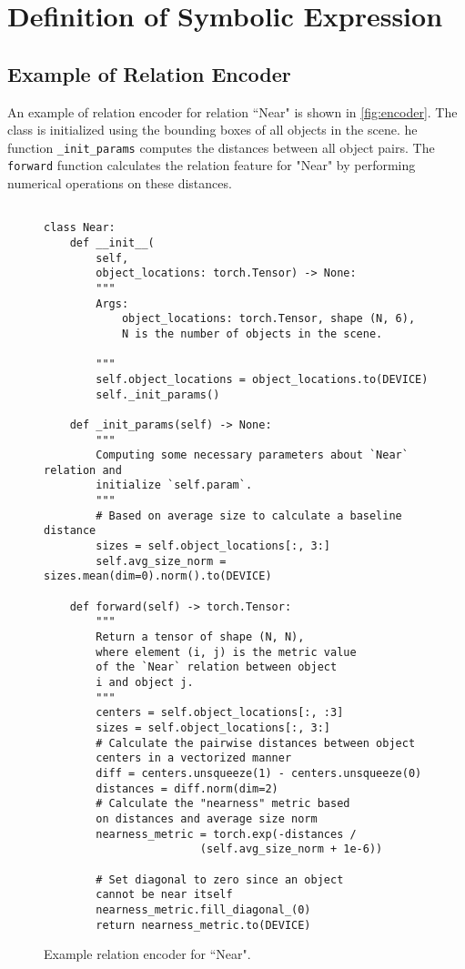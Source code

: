 \section{Definition of Symbolic Expression}
\label{sec:retreiver}
\subsection{Example of Relation Encoder}

An example of relation encoder for relation ``Near" is shown in \autoref{fig:encoder}. 
The class is initialized using the bounding boxes of all objects in the scene.  
he function \texttt{\_init\_params} computes the distances between all object pairs. The \texttt{forward} function calculates the relation feature for "Near" by performing numerical operations on these distances.

\begin{figure}
\centering
\begin{lstlisting}[style=pythonstyle]

class Near:
    def __init__(
        self, 
        object_locations: torch.Tensor) -> None:
        """
        Args:
            object_locations: torch.Tensor, shape (N, 6), 
            N is the number of objects in the scene.

        """
        self.object_locations = object_locations.to(DEVICE)
        self._init_params()

    def _init_params(self) -> None:
        """
        Computing some necessary parameters about `Near` relation and 
        initialize `self.param`.
        """
        # Based on average size to calculate a baseline distance
        sizes = self.object_locations[:, 3:]
        self.avg_size_norm = sizes.mean(dim=0).norm().to(DEVICE)

    def forward(self) -> torch.Tensor:
        """
        Return a tensor of shape (N, N), 
        where element (i, j) is the metric value  
        of the `Near` relation between object  
        i and object j. 
        """
        centers = self.object_locations[:, :3]
        sizes = self.object_locations[:, 3:]
        # Calculate the pairwise distances between object 
        centers in a vectorized manner
        diff = centers.unsqueeze(1) - centers.unsqueeze(0)
        distances = diff.norm(dim=2)
        # Calculate the "nearness" metric based 
        on distances and average size norm
        nearness_metric = torch.exp(-distances / 
                        (self.avg_size_norm + 1e-6))
        
        # Set diagonal to zero since an object 
        cannot be near itself
        nearness_metric.fill_diagonal_(0)
        return nearness_metric.to(DEVICE)
\end{lstlisting}
\caption{Example relation encoder for ``Near".}
\label{fig:encoder}
\end{figure}




